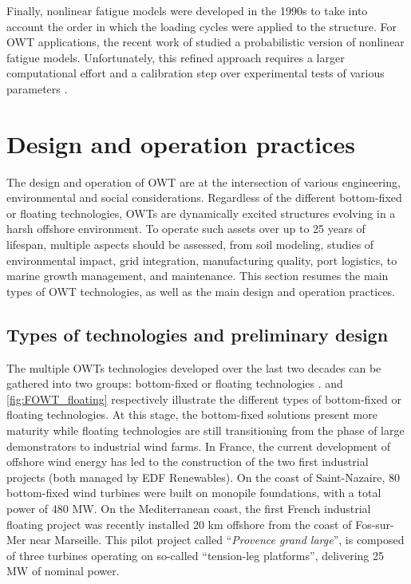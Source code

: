 Finally, nonlinear fatigue models were developed in the 1990s \citep{fatemi_1998} to take into account the order in which the loading cycles were applied to the structure. 
For OWT applications, the recent work of \citet{rocher_2020_nonlinear_fatigue} studied a probabilistic version of nonlinear fatigue models. 
Unfortunately, this refined approach requires a larger computational effort and a calibration step over experimental tests of various parameters \citep{freyssinet_2023_nonlinear_fatigue}.  


\section{Design and operation practices} \label{sec:owt_design}

The design and operation of OWT are at the intersection of various engineering, environmental and social considerations. 
Regardless of the different bottom-fixed or floating technologies, OWTs are dynamically excited structures evolving in a harsh offshore environment.   
To operate such assets over up to 25 years of lifespan, multiple aspects should be assessed, from soil modeling, studies of environmental impact, grid integration, manufacturing quality, port logistics, to marine growth management, and maintenance. 
This section resumes the main types of OWT technologies, as well as the main design and operation practices.   

\subsection{Types of technologies and preliminary design}
The multiple OWTs technologies developed over the last two decades can be gathered into two groups: bottom-fixed or floating technologies \citep{eolien_en_mer_2022}. 
 and \ref{fig:FOWT_floating} respectively illustrate the different types of bottom-fixed or floating technologies. 
At this stage, the bottom-fixed solutions present more maturity while floating technologies are still transitioning from the phase of large demonstrators to industrial wind farms. 
In France, the current development of offshore wind energy has led to the construction of the two first industrial projects (both managed by EDF Renewables). 
On the coast of Saint-Nazaire, 80 bottom-fixed wind turbines were built on monopile foundations, with a total power of 480 MW. 
On the Mediterranean coast, the first French industrial floating project was recently installed 20 km offshore from the coast of Fos-sur-Mer near Marseille. 
This pilot project called ``\textit{Provence grand large}'', is composed of three turbines operating on so-called ``tension-leg platforms'', delivering 25 MW of nominal power.     

